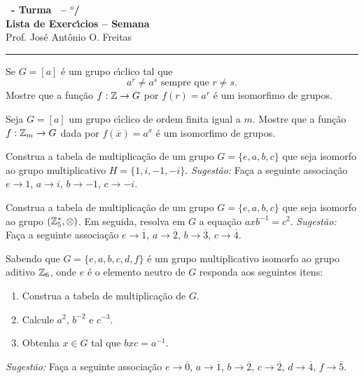 \documentclass[12pt]{exam}
\begin{document}
\begin{center}

    {\Large\bf \disciplina\ - Turma \turma\ -- \semestre$^{o}$/\ano} \\ \vspace{9pt} {\large\bf
        Lista de Exerc{\'\i}cios -- Semana \numerosemana}\\ \vspace{9pt} Prof. Jos{\'e} Ant{\^o}nio O. Freitas
    \end{center}
    \hrule

    \vspace{.6cm}

    \questao{} Se $G = [a]$ \'e um grupo c{\'\i}clico tal que
    \[
        a^r \ne a^s \mbox{ sempre que } r \ne s.
    \]
    Mostre que a fun\c{c}\~ao $f : \mathbb{Z} \to G$ por $f(r) = a^r$ \'e um isomorfimo de grupos.

    \vspace{.3cm}

    \questao{} Seja $G = [a]$ um grupo c{\'\i}clico de ordem finita igual a $m$. Mostre que a fun\c{c}\~ao $f : \mathbb{Z}_m \to G$ dada por $f(\overline{x}) = a^x$ \'e um isomorfimo de grupos.

    \vspace{.3cm}

    \questao{} Construa a tabela de multiplica\c{c}\~ao de um grupo $G = \{e, a, b, c\}$ que seja isomorfo ao grupo multiplicativo $H = \{1, i, -1, -i\}$.
    \textit{Sugest\~ao:} Fa\c{c}a a seguinte associa\c{c}\~ao $e \to 1$, $a \to i$, $b \to -1$, $c \to -i$.

    \vspace{.3cm}

    \questao{} Construa a tabela de multiplica\c{c}\~ao de um grupo $G = \{e, a, b, c\}$ que seja isomorfo ao grupo $(\mathbb{Z}_5^*, \otimes)$. Em seguida, resolva em $G$ a equa\c{c}\~ao $axb^{-1} = c^2$.
    \textit{Sugest\~ao:} Fa\c{c}a a seguinte associa\c{c}\~ao $e \to \overline{1}$, $a \to \overline{2}$, $b \to \overline{3}$, $c \to \overline{4}$.

    \vspace{.3cm}

    \questao{} Sabendo que $G = \{e, a, b, c, d, f\}$ \'e um grupo multiplicativo isomorfo ao grupo aditivo $\mathbb{Z}_6$, onde $e$ \'e o elemento neutro de $G$ responda aos seguintes itens:
    \begin{enumerate}[label=({\alph*})]
      \item Construa a tabela de multiplica\c{c}\~ao de $G$.

      \item Calcule $a^2$, $b^{-2}$ e $c^{-3}$.

      \item Obtenha $x \in G$ tal que $bxc = a^{-1}$.
    \end{enumerate}
    \textit{Sugest\~ao:} Fa\c{c}a a seguinte associa\c{c}\~ao $e \to \overline{0}$, $a \to \overline{1}$, $b \to \overline{2}$, $c \to \overline{2}$, $d \to \overline{4}$, $f \to \overline{5}$.
\end{document}
